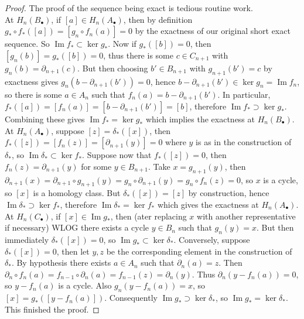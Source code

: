 \begin{proof}
    The proof of the sequence being exact is tedious routine work.\\
    At $H_n(B_\bullet)$, if $[a]\in H_n(A_\bullet)$, then by definition $g_\ast\circ f_\ast([a])=[g_n\circ f_n(a)]=0$ by the exactness of our original short exact sequence.
    So $\operatorname{Im}f_\ast\subset \ker g_\ast$.
    Now if $g_\ast([b])=0$, then $[g_n(b)]=g_\ast([b])=0$, thus there is some $c\in C_{n+1}$ with $g_n(b)=\partial_{n+1}(c)$.
    But then choosing $b'\in B_{n+1}$ with $g_{n+1}(b')=c$ by exactness gives $g_n(b-\partial_{n+1}(b'))=0$, hence $b-\partial_{n+1}(b')\in\ker g_n=\operatorname{Im}f_n$, so there is some $a\in A_n$ such that $f_n(a)=b-\partial_{n+1}(b')$.
    In particular, $f_\ast([a])=[f_n(a)]=[b-\partial_{n+1}(b')]=[b]$, therefore $\operatorname{Im}f_\ast\supset\ker g_\ast$.
    Combining these gives $\operatorname{Im}f_\ast=\ker g_\ast$ which implies the exactness at $H_n(B_\bullet)$.\\
    At $H_n(A_\bullet)$, suppose $[z]=\delta_\ast([x])$, then $f_\ast([z])=[f_n(z)]=[\partial_{n+1}(y)]=0$ where $y$ is as in the construction of $\delta_\ast$, so $\operatorname{Im}\delta_\ast\subset\ker f_\ast$.
    Suppose now that $f_\ast([z])=0$, then $f_n(z)=\partial_{n+1}(y)$ for some $y\in B_{n+1}$.
    Take $x=g_{n+1}(y)$, then $\partial_{n+1}(x)=\partial_{n+1}\circ g_{n+1}(y)=g_n\circ\partial_{n+1}(y)=g_n\circ f_n(z)=0$, so $x$ is a cycle, so $[x]$ is a homology class.
    But $\delta_\ast([x])=[z]$ by construction, hence $\operatorname{Im}\delta_\ast\supset\ker f_\ast$, therefore $\operatorname{Im}\delta_\ast=\ker f_\ast$ which gives the exactness at $H_n(A_\bullet)$.\\
    At $H_n(C_\bullet)$, if $[x]\in\operatorname{Im}g_\ast$, then (ater replacing $x$ with another representative if necessary) WLOG there exists a cycle $y\in B_n$ such that $g_n(y)=x$.
    But then immediately $\delta_\ast([x])=0$, so $\operatorname{Im}g_\ast\subset\ker\delta_\ast$.
    Conversely, suppose $\delta_\ast([x])=0$, then let $y,z$ be the corresponding element in the construction of $\delta_\ast$.
    By hypothesis there exists $a\in A_n$ such that $\partial_n(a)=z$.
    Then $\partial_n\circ f_n(a)=f_{n-1}\circ\partial_n(a)=f_{n-1}(z)=\partial_n(y)$.
    Thus $\partial_n(y-f_n(a))=0$, so $y-f_n(a)$ is a cycle.
    Also $g_n(y-f_n(a))=x$, so $[x]=g_\ast([y-f_n(a)])$.
    Consequently $\operatorname{Im}g_\ast\supset\ker\delta_\ast$, so $\operatorname{Im}g_\ast=\ker\delta_\ast$.
    This finished the proof.
\end{proof}
